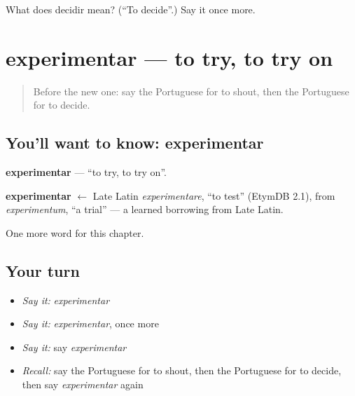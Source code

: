 \begin{tcolorbox}[breakable,colback=teal!4,colframe=teal!35!black,title={Before you move on}]
What does decidir mean? (\textquotedblleft{}To decide\textquotedblright{}.) Say it once more.
\end{tcolorbox}
\section[experimentar]{experimentar — to try, to try on}

\label{lesson:PT-C139-experimentar}



\begin{quote}
Before the new one: say the Portuguese for to shout, then the Portuguese for to decide.
\end{quote}

\subsection*{You'll want to know: experimentar}
\textbf{experimentar} — \textquotedblleft{}to try, to try on\textquotedblright{}.

\begin{cousinweb}
\textbf{experimentar} $\leftarrow$ Late Latin \emph{experimentare}, \textquotedblleft{}to test\textquotedblright{} (EtymDB 2.1), from \emph{experimentum}, \textquotedblleft{}a trial\textquotedblright{} — a learned borrowing from Late Latin.
\end{cousinweb}

\begin{grammarlens}[title={What you've built}]
One more word for this chapter.
\end{grammarlens}

\subsection*{Your turn}
\begin{itemize}
\raggedright
  \item \emph{Say it:} \emph{experimentar}
  \item \emph{Say it:} \emph{experimentar}, once more
  \item \emph{Say it:} say \emph{experimentar}
  \item \emph{Recall:} say the Portuguese for to shout, then the Portuguese for to decide, then say \emph{experimentar} again
\end{itemize}


